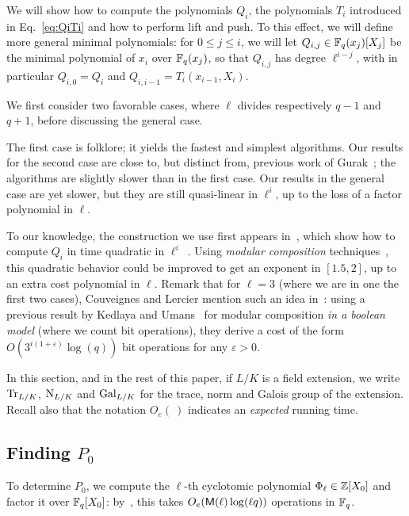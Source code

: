 \documentclass{sig-alternate}
\newcommand{\Cyc}{\Phi}  %
\begin{document}
We will show how to compute the polynomials $Q_i$, the polynomials
$T_i$ introduced in Eq.~\eqref{eq:QiTi} and how to perform lift and
push.  To this effect, we will define more general minimal
polynomials: for $0 \le j \le i$, we will let $Q_{i,j} \in
\mathbb{F}_q(x_j)[X_j]$ be the minimal polynomial of $x_i$ over $\mathbb{F}_q(x_j)$,
so that $Q_{i,j}$ has degree $\ell^{i-j}$, with in particular
$Q_{i,0}=Q_i$ and $Q_{i,i-1}=T_i(x_{i-1},X_i)$.

We first consider two favorable cases, where $\ell$ divides
respectively $q-1$ and $q+1$, before discussing the general case.

The first case is folklore; it yields the fastest and simplest
algorithms. Our results for the second case are close to, but distinct
from, previous work of Gurak~\cite{gurak06}; the algorithms are
slightly slower than in the first case. Our results in the general
case are yet slower, but they are still quasi-linear in $\ell^i$, up
to the loss of a factor polynomial in $\ell$. 

To our knowledge, the construction we use first appears
in~\cite{Shoup90,shoup94}, which show how to compute $Q_i$ in time
quadratic in $\ell^i$~\cite[Th.~11]{shoup94}.  Using {\em modular
  composition} techniques~\cite[Ch.~12]{vzGG}, this quadratic behavior
could be improved to get an exponent in $[1.5, 2]$, up to an extra
cost polynomial in $\ell$.  Remark that for $\ell=3$ (where we are in
one the first two cases), Couveignes and Lercier mention such an idea
in~\cite[\S~2.4]{couveignes+lercier11}: using a previous result by
Kedlaya and Umans~\cite{KeUm11} for modular composition {\em in a
  boolean model} (where we count bit operations), they derive a cost
of the form $O(3^{i(1+\varepsilon)} \log(q))$ bit operations for any
$\varepsilon > 0$.

In this section, and in the rest of this paper, if $L/K$ is a field
extension, we write $\operatorname{Tr}_{L/K}$, $\operatorname{N}_{L/K}$ and $\operatorname{Gal}_{L/K}$ for
the trace, norm and Galois group of the extension. Recall also that
the notation $O_e(\ )$ indicates an {\em expected} running time.


\subsection{Finding $P_0$}

To determine $P_0$, we compute the $\ell$-th cyclotomic polynomial
$\Cyc_\ell \in \Z[X_0]$ and factor it over $\mathbb{F}_q[X_0]$:
by~\cite[Th.~9]{shoup94}, this takes $O_e(\mathsf{M}(\ell)\log(\ell q))$
operations in $\mathbb{F}_q$.
\end{document}

